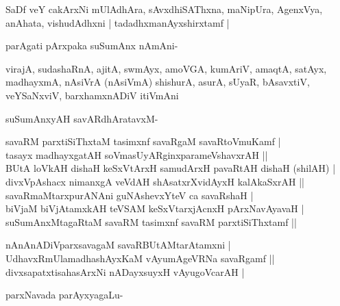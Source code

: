 SaDf veY cakArxNi mUlAdhAra, sAvxdhiSAThxna, maNipUra, AgenxVya, anAhata, vishudAdhxni | tadadhxmanAyxshirxtamf |\label{154}\label{155}

parAgati pArxpaka suSumAnx nAmAni-

virajA, sudashaRnA, ajitA, swmAyx, amoVGA, kumAriV, amaqtA, satAyx, madhayxmA, nAsiVrA (nAsiVmA) shishurA, asurA, sUyaR, bAsavxtiV, veYSaNxviV, barxhamxnADiV itiVmAni

suSumAnxyAH savARdhAratavxM-

\begin{shloka}
savaRM parxtiSiThxtaM tasimxnf savaRgaM savaRtoVmuKamf |\\
tasayx madhayxgatAH soVmasUyARginxparameVshavxrAH ||\\
BUtA loVkAH dishaH keSxVtArxH samudArxH pavaRtAH dishaH (shilAH) |\\
divxVpAshacx nimanxgA veVdAH shAsatxrXvidAyxH kalAkaSxrAH ||\\
savaRmaMtarxpurANAni guNAshevxYteV ca savaRshaH |\\
biVjaM biVjAtamxkAH teVSAM keSxVtarxjAcnxH pArxNavAyavaH |\\
suSumAnxMtagaRtaM savaRM tasimxnf savaRM parxtiSiThxtamf ||
\end{shloka}

\begin{shloka}
nAnAnADiVparxsavagaM savaRBUtAMtarAtamxni |\\\label{155}
UdhavxRmUlamadhashAyxKaM vAyumAgeVRNa savaRgamf ||\\
divxsapatxtisahasArxNi nADayxsuyxH vAyugoVcarAH |\label{155}
\end{shloka}

parxNavada parAyxyagaLu-

